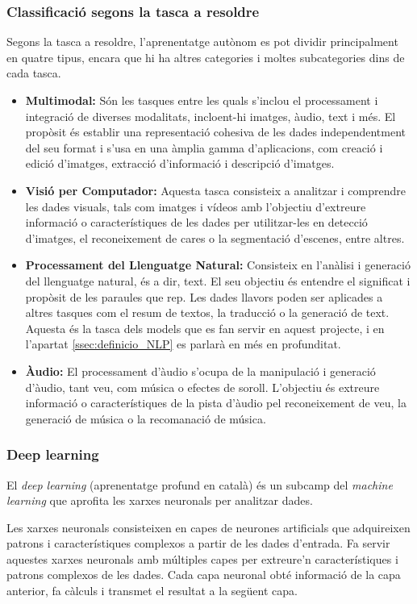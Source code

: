 \subsubsection{Classificació segons la tasca a resoldre}
Segons la tasca a resoldre, l'aprenentatge autònom es pot dividir principalment en quatre tipus, encara que hi ha altres categories i moltes subcategories dins de cada tasca. 
\begin{itemize}
    \item \textbf{Multimodal:} Són les tasques entre les quals s'inclou el processament i integració de diverses modalitats, incloent-hi imatges, àudio, text i més. El propòsit és establir una representació cohesiva de les dades independentment del seu format i s'usa en una àmplia gamma d'aplicacions, com creació i edició d'imatges, extracció d'informació i descripció d'imatges.
    \item \textbf{Visió per Computador:} Aquesta tasca consisteix a analitzar i comprendre les dades visuals, tals com imatges i vídeos amb l'objectiu d'extreure informació o característiques de les dades per utilitzar-les en detecció d'imatges, el reconeixement de cares o la segmentació d'escenes, entre altres.
    \item \textbf{Processament del Llenguatge Natural:} Consisteix en l'anàlisi i generació del llenguatge natural, és a dir, text. El seu objectiu és entendre el significat i propòsit de les paraules que rep. Les dades llavors poden ser aplicades a altres tasques com el resum de textos, la traducció o la generació de text. Aquesta és la tasca dels models que es fan servir en aquest projecte, i en l'apartat \ref{ssec:definicio_NLP} es parlarà en més en profunditat.
    \item \textbf{Àudio:} El processament d'àudio s'ocupa de la manipulació i generació d'àudio, tant veu, com música o efectes de soroll. L'objectiu és extreure informació o característiques de la pista d'àudio pel reconeixement de veu, la generació de música o la recomanació de música. 
\end{itemize}

\subsubsection{Deep learning}

El \textit{deep learning} (aprenentatge profund en català) és un subcamp del \textit{machine learning} que aprofita les xarxes neuronals per analitzar dades. 

Les xarxes neuronals consisteixen en capes de neurones artificials que adquireixen patrons i característiques complexos a partir de les dades d'entrada. Fa servir aquestes xarxes neuronals amb múltiples capes per extreure'n característiques i patrons complexos de les dades. Cada capa neuronal obté informació de la capa anterior, fa càlculs i transmet el resultat a la següent capa. 


